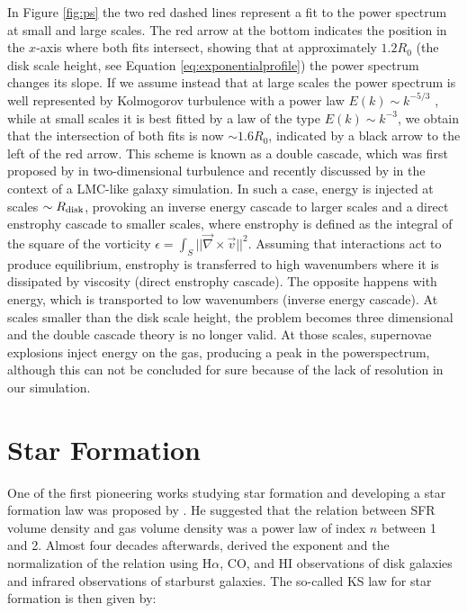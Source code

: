 \documentclass[twocolumn]{aastex}
\newcommand{\Ro}{R_0}
\begin{document}
In Figure \ref{fig:ps} the two red dashed lines represent a fit to the power spectrum at small and large scales. The red arrow at the bottom indicates the position in the $x$-axis where both fits intersect, showing that at approximately $1.2\Ro$ (the disk scale height, see Equation \ref{eq:exponentialprofile}) the power spectrum changes its slope. If we assume instead that at large scales the power spectrum is well represented by Kolmogorov turbulence with a power law $E(k) \sim k^{-5/3}$ \citep{Kolmogorov_41}, while at small scales it is best fitted by a law of the type $E(k) \sim k^{-3}$, we obtain that the intersection of both fits is now $\sim 1.6\Ro$, indicated by a black arrow to the left of the red arrow. This scheme is known as a double cascade, which was first proposed by \citet{Kraichnan_67} in two-dimensional turbulence and recently discussed by \citet{Bournaud_10} in the context of a LMC-like galaxy simulation. In such a case, energy is injected at scales $\sim R_{\rm disk}$, provoking an inverse energy cascade to larger scales and a direct enstrophy cascade to smaller scales, where enstrophy is defined as the integral of the square of the vorticity $\epsilon=\int_S ||\vec{\nabla} \times \vec{v}||^2$. Assuming that interactions act to produce equilibrium, enstrophy is transferred to high wavenumbers where it is dissipated by viscosity (direct enstrophy cascade). The opposite happens with energy, which is transported to low wavenumbers (inverse energy cascade). At scales smaller than the disk scale height, the problem becomes three dimensional and the double cascade theory is no longer valid. At those scales, supernovae explosions inject energy on the gas, producing a peak in the powerspectrum, although this can not be concluded for sure because of the lack of resolution in our simulation.

\section{Star Formation}
\label{sec:SF}

One of the first pioneering works studying star formation and developing a star formation law was proposed by \citet{Schmidt_59, Schmidt_63}. He suggested that the relation between SFR volume density and gas volume density was a power law of index $n$ between 1 and 2. Almost four decades afterwards, \citet{K98} derived the exponent and the normalization of the relation using H$\alpha$, CO, and HI observations of disk galaxies and infrared observations of starburst galaxies. The so-called KS law for star formation is then given by:
\end{document}

